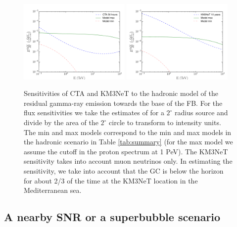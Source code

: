 \begin{figure}[h]
\centering
 \includegraphics[width=0.48\textwidth]{plots/low_lat_FB_CTA.pdf}
 \includegraphics[width=0.48\textwidth]{plots/low_lat_FB_KM3.pdf}
 \caption{Sensitivities of CTA and KM3NeT to the hadronic model of the residual gamma-ray emission towards the base of the FB.
 For the flux sensitivities we take the estimates of \cite{2018APh...100...69A} for a $2^\circ$ radius source and divide by the
 area of the $2^\circ$ circle to transform to intensity units. The min and max models correspond to the min and max models in
 the hadronic scenario in Table \ref{tab:summary} (for the max model we assume the cutoff in the proton spectrum at 1 PeV).
 The KM3NeT sensitivity takes into account muon neutrinos only.
 In estimating the sensitivity, we take into account that the GC is below the horizon for about 2/3 of the time
 at the KM3NeT location in the Mediterranean sea.
 }
 \label{fig:sensitivities}
\end{figure}


\subsection{A nearby SNR or a superbubble scenario}

